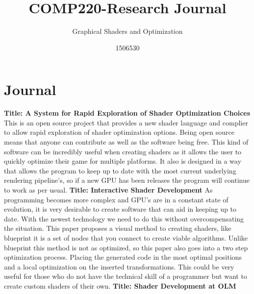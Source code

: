 \documentclass{scrartcl}
\title{COMP220-Research Journal}
\subtitle{Graphical Shaders and Optimization}
\author{1506530}
\begin{document}
	
	
	\maketitle
	\section{Journal}
	
	\newline
	\newline
	\textbf{Title: A System for Rapid Exploration of Shader Optimization Choices}\cite{He}
This is an open source project that provides a new shader language and complier to allow rapid exploration of shader optimization options. Being open source means that anyone can contribute as well as the software being free. This kind of software can be incredibly useful when creating shaders as it allows the user to quickly optimize their game for multiple platforms. It also is designed in a way that allows the program to keep up to date with the most current underlying rendering pipeline's, so if a new GPU has been releases the program will continue to work as per usual.
	\newline
	\newline
	\newline
	\textbf{Title: Interactive Shader Development}\cite{Jensen}
	\newline
As programming becomes more complex and GPU's are in a constant state of evolution, it is very desirable to create software that can aid in keeping up to date. With the newest technology we need to do this without overcompensating the situation. This paper proposes a visual method to creating shaders, like blueprint it is a set of nodes that you connect to create viable algorithms. Unlike blueprint this method is not as optimized, so this paper also goes into a two step optimization process. Placing the generated code in the most optimal positions and a local optimization on the inserted transformations. This could be very useful for those who do not have the technical skill of a programmer but want to create custom shaders of their own.
	\newline
	\newline
	\newline
	\textbf{Title: Shader Development at OLM}\cite{Ogak}
\end{document}

